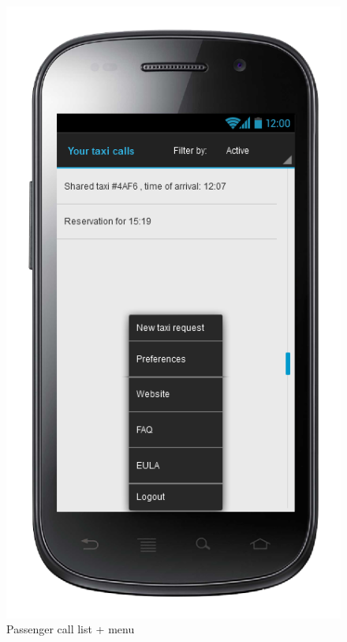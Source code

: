 \begin{figure} [h]
\centering
  	  \includegraphics[scale=0.5]{ui/Passenger call list + menu.png}
\caption{Passenger call list + menu}
    
	\end{figure}

